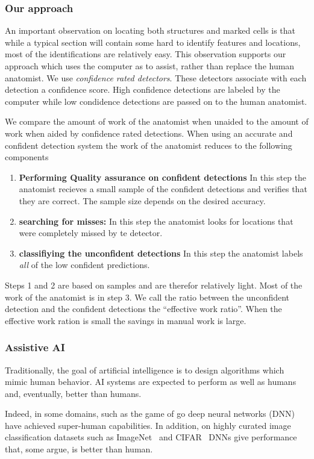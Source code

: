 \documentclass[11pt]{article}
\begin{document}
\subsubsection{Our approach}


An important observation on locating both structures and marked cells
is that while a typical section will contain some hard to identify
features and locations, most of the identifications are relatively
easy. This observation supports our approach which uses the computer as
to assist, rather than replace the human anatomist. We
use {\em confidence rated detectors}. These detectors
associate with each detection a confidence score. High confidence
detections are labeled by the computer while low condidence detections
are passed on to the human anatomist.

We compare the amount of work of the anatomist when unaided to the
amount of work when aided by confidence rated detections.
When using an accurate and confident detection system the work of the
anatomist reduces to the following components
\begin{enumerate}
\item {\bf Performing Quality assurance on confident detections} In this step the
  anatomist recieves a small sample of the confident detections and
  verifies that they are correct. The sample size depends on the
  desired accuracy.
\item {\bf searching for misses:} In this step the anatomist looks
  for locations that were completely missed by te detector.
\item {\bf classifiying the unconfident detections} In this step
  the anatomist labels {\em all} of the low confident predictions.
  \end{enumerate}
Steps 1 and 2 are based on samples and are therefor relatively light.
Most of the work of the anatomist is in step 3. We call the ratio
between the unconfident detection and the confident detections the 
``effective work ratio''. When the effective work ration is small the
savings in manual work is large.
  
\subsubsection{Assistive AI} Traditionally, the goal of artificial
  intelligence is to design algorithms which mimic human behavior. AI
  systems are expected to perform as well as humans and, eventually,
  better than humans.

Indeed, in some domains, such as the game of go \cite{silver2017mastering} deep neural
networks (DNN)  have achieved super-human capabilities. In addition,
on highly curated image classification datasets such as ImageNet~\cite{deng2009imagenet} and
CIFAR~\cite{krizhevsky2009learning} DNNs give performance that, some argue, is better than
human. 
\end{document}
